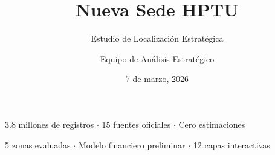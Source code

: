 \documentclass[aspectratio=169, 11pt]{beamer}
\title{Nueva Sede HPTU}
\subtitle{Estudio de Localización Estratégica}
\author{Equipo de Análisis Estratégico}
\date{7 de marzo, 2026}
\begin{document}
{
\begin{frame}[plain]
\vfill
\begin{center}
{\inserttitle}

\vspace{10pt}
{\insertsubtitle}

\vspace{20pt}

\vspace{14pt}
{\small\textcolor{white!80}{
3.8 millones de registros $\cdot$ 15 fuentes oficiales $\cdot$ Cero estimaciones}}

\vspace{6pt}
{\small\textcolor{white!60}{
5 zonas evaluadas $\cdot$ Modelo financiero preliminar $\cdot$ 12 capas interactivas}}

\vspace{20pt}
{\footnotesize{}\insertdate}
\end{center}
\vfill
\end{frame}
}
\end{document}
